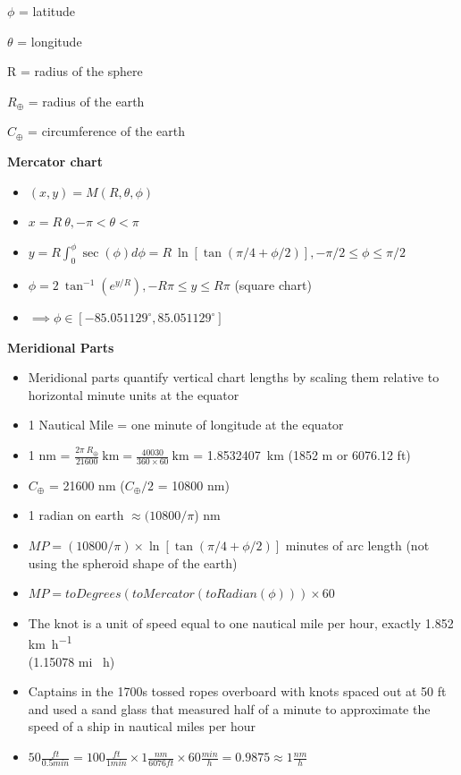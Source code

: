 \documentclass[onecolumn,3p]{elsarticle}
\begin{document}
$\phi$ = latitude

$\theta$ = longitude

R = radius of the sphere

$R_{\oplus}$ = radius of the earth

$C_{\oplus}$ = circumference of the earth

\vspace{0.5cm}
\newpage
\textbf{Mercator chart~\cite{Vezie2016}}
\begin{itemize}

\item $(x,y) = M(R,\theta,\phi)$

\item $x = R\ \theta , -\pi < \theta < \pi$

\item $y = R \int_{0}^{\phi } \sec(\phi) d\phi = R\ \ln [\tan (\pi/4 + \phi/2)], -\pi/2 \leq \phi \leq \pi/2$

\item $\phi = 2\ \tan^{-1} (e^{y/R}), -R\pi \leq y \leq R\pi$ (square chart)
\item[] $\implies \phi \in [-85.051129^\circ, 85.051129^\circ]$

\end{itemize}

\vspace{0.5cm}
\textbf{Meridional Parts~\cite{Bowditch2024}}

\begin{itemize}
\item Meridional parts quantify vertical chart lengths by scaling them relative to horizontal minute units at the equator
\item 1 Nautical Mile = one minute of longitude at the equator
\item 1 nm = $\frac{2\pi\ R_{\oplus}}{21600}\ \si{\km} = \frac{40030}{360 \times 60}\ \si{\km}$ = \num{1.8532407}\ \si{\km} (\num{1852} \si{\meter} or \num{6076.12} ft)
\item $C_{\oplus}$ = 21600 nm ($C_{\oplus}/2$ = 10800 nm)
\item 1 radian on earth $\approx (10800/\pi$) nm
\item $MP = (10800/\pi) \times \ln [\tan (\pi/4 + \phi/2)]$ minutes of arc length (not using the spheroid shape of the earth)
\item $MP = toDegrees(toMercator(toRadian(\phi))) \times 60$
\item The knot is a unit of speed equal to one nautical mile per hour, exactly \num{1.852} \si{\km\per\hour} \\ (\num{1.15078} mi \si{\per\hour})
\item Captains in the 1700s tossed ropes overboard with knots spaced out at 50 ft and used a sand glass
that measured half of a minute to approximate the speed of a ship in nautical miles per hour
\item $50 \frac{ft}{0.5 min} = 100 \frac{ft}{1 min} \times 1 \frac{nm}{6076 ft} \times 60 \frac{min}{h} = 0.9875 \approx 1 \frac{nm}{h}$
\end{itemize}
\end{document}
